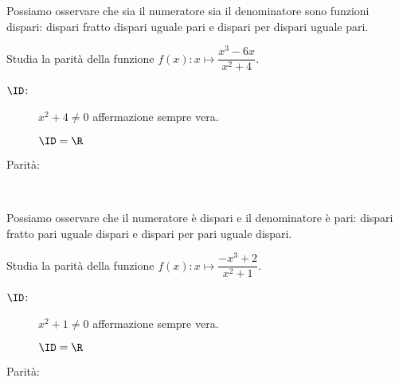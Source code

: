 \begin{osservazione}
Possiamo osservare che sia il numeratore sia il denominatore sono funzioni 
dispari: dispari fratto dispari uguale pari e
dispari per dispari uguale pari. 
\end{osservazione}

\begin{esempio}
\label{esempio:funzioni_parita2}
Studia la parità della funzione \(f(x): x \mapsto \dfrac{x^3 -6x}{x^2+4}\).

\begin{description}
\item [\(\ID\):] \(x^2 +4 \ne 0\) \quad affermazione sempre vera.

\(\ID = \R\)
\item [Parità:] ~

\end{description}
\end{esempio}

\begin{osservazione}
Possiamo osservare che il numeratore è dispari e il denominatore è pari: 
dispari fratto pari uguale dispari e dispari per pari uguale dispari. 
\end{osservazione}

\begin{esempio}
\label{esempio:funzioni_parita3}
Studia la parità della funzione \(f(x): x \mapsto \dfrac{-x^3 +2}{x^2 +1}\).

\begin{description}
\item [\(\ID\):] \(x^2 +1 \ne 0\) \quad affermazione sempre vera.

\(\ID = \R\)
\item [Parità:] ~

\end{description}
\end{esempio}

